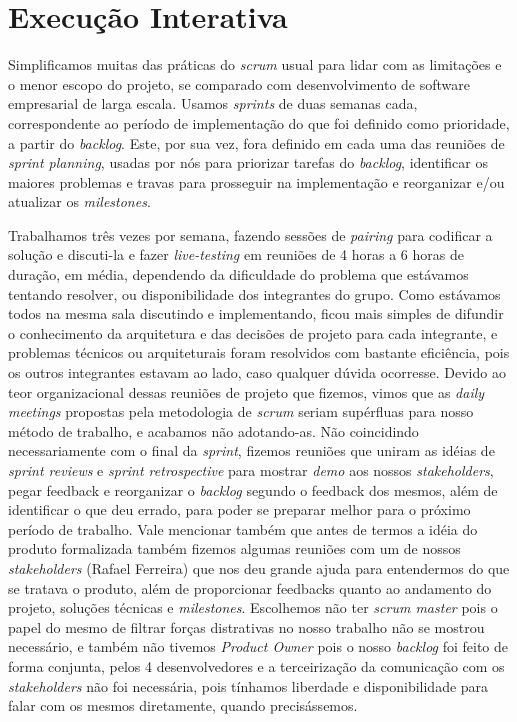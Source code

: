 \section{Execução Interativa}
Simplificamos muitas das práticas do \textit{scrum} usual para lidar com as limitações e o menor escopo do projeto, se comparado com desenvolvimento de software empresarial de larga escala.
Usamos \textit{sprints} de duas semanas cada, correspondente ao período de implementação do que foi definido como prioridade, a partir do \textit{backlog}. Este, por sua vez, fora definido em cada uma das reuniões de \textit{sprint planning}, usadas por nós para priorizar tarefas do \textit{backlog}, identificar os maiores problemas e travas para prosseguir na implementação e reorganizar e/ou atualizar os \textit{milestones}.\par
Trabalhamos três vezes por semana, fazendo sessões de \textit{pairing} para codificar a solução e discuti-la e fazer \textit{live-testing} em reuniões de 4 horas a 6 horas de duração, em média, dependendo da dificuldade do problema que estávamos tentando resolver, ou disponibilidade dos integrantes do grupo.
Como estávamos todos na mesma sala discutindo e implementando, ficou mais simples de difundir o conhecimento da arquitetura e das decisões de projeto para cada integrante, e problemas técnicos ou arquiteturais foram resolvidos com bastante eficiência, pois os outros integrantes estavam ao lado, caso qualquer dúvida ocorresse. Devido ao teor organizacional dessas reuniões de projeto que fizemos, vimos que as \textit{daily meetings} propostas pela metodologia de \textit{scrum} seriam supérfluas para nosso método de trabalho, e acabamos não adotando-as.
Não coincidindo necessariamente com o final da \textit{sprint}, fizemos reuniões que uniram as idéias de \textit{sprint reviews} e \textit{sprint retrospective} para mostrar \textit{demo} aos nossos \textit{stakeholders}, pegar feedback e reorganizar o \textit{backlog} segundo o feedback dos mesmos, além de identificar o que deu errado, para poder se preparar melhor para o próximo período de trabalho. 
Vale mencionar também que antes de termos a idéia do produto formalizada também fizemos algumas reuniões com um de nossos \textit{stakeholders} (Rafael Ferreira) que nos deu grande ajuda para entendermos do que se tratava o produto, além de proporcionar feedbacks quanto ao andamento do projeto, soluções técnicas e \textit{milestones}.
Escolhemos não ter \textit{scrum master} pois o papel do mesmo de filtrar forças distrativas no nosso trabalho não se mostrou necessário, e também não tivemos \textit{Product Owner} pois o nosso \textit{backlog} foi feito de forma conjunta, pelos 4 desenvolvedores e a terceirização da comunicação com os \textit{stakeholders} não foi necessária, pois tínhamos liberdade e disponibilidade para falar com os mesmos diretamente, quando precisássemos.

